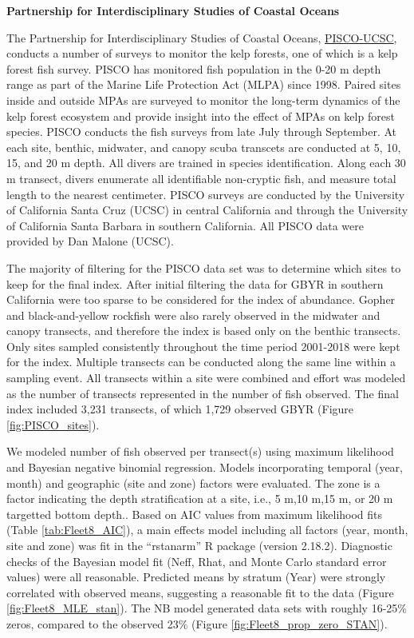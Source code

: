 \documentclass[12pt,]{article}
\begin{document}
\textbf{Partnership for Interdisciplinary Studies of Coastal Oceans}

The Partnership for Interdisciplinary Studies of Coastal Oceans,
\href{http://www.piscoweb.org/kelp-forest-study}{PISCO-UCSC}, conducts a
number of surveys to monitor the kelp forests, one of which is a kelp
forest fish survey. PISCO has monitored fish population in the 0-20 m
depth range as part of the Marine Life Protection Act (MLPA) since 1998.
Paired sites inside and outside MPAs are surveyed to monitor the
long-term dynamics of the kelp forest ecosystem and provide insight into
the effect of MPAs on kelp forest species. PISCO conducts the fish
surveys from late July through September. At each site, benthic,
midwater, and canopy scuba transcets are conducted at 5, 10, 15, and 20
m depth. All divers are trained in species identification. Along each 30
m transect, divers enumerate all identifiable non-cryptic fish, and
measure total length to the nearest centimeter. PISCO surveys are
conducted by the University of California Santa Cruz (UCSC) in central
California and through the University of California Santa Barbara in
southern California. All PISCO data were provided by Dan Malone (UCSC).

The majority of filtering for the PISCO data set was to determine which
sites to keep for the final index. After initial filtering the data for
GBYR in southern California were too sparse to be considered for the
index of abundance. Gopher and black-and-yellow rockfish were also
rarely observed in the midwater and canopy transects, and therefore the
index is based only on the benthic transects. Only sites sampled
consistently throughout the time period 2001-2018 were kept for the
index. Multiple transects can be conducted along the same line within a
sampling event. All transects within a site were combined and effort was
modeled as the number of transects represented in the number of fish
observed. The final index included 3,231 transects, of which 1,729
observed GBYR (Figure \ref{fig:PISCO_sites}).

We modeled number of fish observed per transect(s) using maximum
likelihood and Bayesian negative binomial regression. Models
incorporating temporal (year, month) and geographic (site and zone)
factors were evaluated. The zone is a factor indicating the depth
stratification at a site, i.e., 5 m,10 m,15 m, or 20 m targetted bottom
depth.. Based on AIC values from maximum likelihood fits (Table
\ref{tab:Fleet8_AIC}), a main effects model including all factors (year,
month, site and zone) was fit in the ``rstanarm'' R package (version
2.18.2). Diagnostic checks of the Bayesian model fit (Neff, Rhat, and
Monte Carlo standard error values) were all reasonable. Predicted means
by stratum (Year) were strongly correlated with observed means,
suggesting a reasonable fit to the data (Figure
\ref{fig:Fleet8_MLE_stan}). The NB model generated data sets with
roughly 16-25\% zeros, compared to the observed 23\% (Figure
\ref{fig:Fleet8_prop_zero_STAN}).
\end{document}
